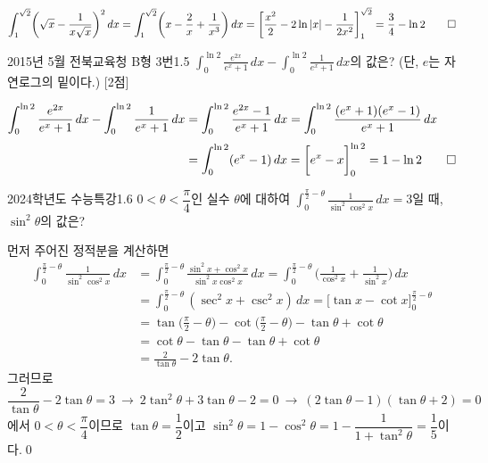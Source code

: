 \documentclass{article}
\begin{document}
\begin{sol}
	\[
		\int_1^{\sqrt2}\biggl(\sqrt x-\frac{1}{x\sqrt x}\biggr)^2\,dx=\int_1^{\sqrt2}\biggl(x-\frac{2}{x}+\frac{1}{x^3}\biggr)\,dx=\biggl[\frac{x^2}{2}-2\ln\vert x\vert-\frac{1}{2x^2}\biggr]_1^{\sqrt2}=\frac{3}{4}-\ln2\qed
	\]
\end{sol}

\begin{exc}{2015년 5월 전북교육청 B형 3번}{1.5}
	$\displaystyle\int_0^{\ln2}\frac{e^{2x}}{e^x+1}\,dx-\int_0^{\ln2}\frac{1}{e^x+1}\,dx$의 값은? (단, $e$는 자연로그의 밑이다.) [2점]
\end{exc}

\begin{sol}
	\begin{align*}
		\int_0^{\ln2}\frac{e^{2x}}{e^x+1}\,dx-\int_0^{\ln2}\frac{1}{e^x+1}\,dx&=\int_0^{\ln2}\frac{e^{2x}-1}{e^x+1}\,dx=\int_0^{\ln2}\frac{(e^x+1)(e^x-1)}{e^x+1}\,dx\\[3pt]
		&=\int_0^{\ln2}(e^x-1)\,dx=\biggl[e^x-x\biggr]_0^{\ln2}=1-\ln2\qed
	\end{align*}
\end{sol}

\begin{exc}{2024학년도 수능특강}{1.6}
	$0<\theta<\dfrac{\pi}{4}$인 실수 $\theta$에 대하여 $\displaystyle\int_0^{\tfrac{\pi}{2}-\theta}\frac{1}{\sin^2\cos^2x}\,dx=3$일 때, $\sin^2\theta$의 값은?
\end{exc}

\begin{sol}
	먼저 주어진 정적분을 계산하면
	\begin{align*}
		\int_0^{\tfrac{\pi}{2}-\theta}\frac{1}{\sin^2\cos^2x}\,dx&=\int_0^{\tfrac{\pi}{2}-\theta}\frac{\sin^2x+\cos^2x}{\sin^2x\cos^2x}\,dx=\int_0^{\tfrac{\pi}{2}-\theta}\biggl(\frac{1}{\cos^2x}+\frac{1}{\sin^2x}\biggr)\,dx\\[3pt]
		&=\int_0^{\tfrac{\pi}{2}-\theta}(\sec^2x+\csc^2x)\,dx=\biggl[\tan x-\cot x\biggr]_0^{\tfrac{\pi}{2}-\theta}\\[3pt]
		&=\tan\biggl(\frac{\pi}{2}-\theta\biggr)-\cot\biggl(\frac{\pi}{2}-\theta\biggr)-\tan\theta+\cot\theta\\[3pt]
		&=\cot\theta-\tan\theta-\tan\theta+\cot\theta\\[3pt]
		&=\frac{2}{\tan\theta}-2\tan\theta.
	\end{align*}
	그러므로
	\[
		\frac{2}{\tan\theta}-2\tan\theta=3~\longrightarrow~2\tan^2\theta+3\tan\theta-2=0~\longrightarrow~(2\tan\theta-1)(\tan\theta+2)=0
	\]
	에서 $0<\theta<\dfrac{\pi}{4}$이므로 $\tan\theta=\dfrac{1}{2}$이고 $\sin^2\theta=1-\cos^2\theta=1-\dfrac{1}{1+\tan^2\theta}=\dfrac{1}{5}$이다.\qed
\end{sol}
\end{document}
